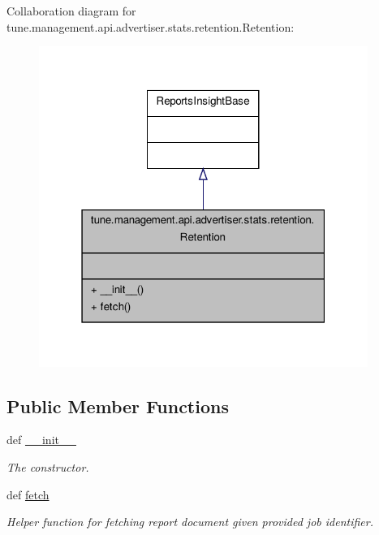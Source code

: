 Collaboration diagram for tune.\-management.\-api.\-advertiser.\-stats.\-retention.\-Retention\-:
\nopagebreak
\begin{figure}[H]
\begin{center}
\leavevmode
\includegraphics[width=304pt]{classtune_1_1management_1_1api_1_1advertiser_1_1stats_1_1retention_1_1Retention__coll__graph}
\end{center}
\end{figure}
\subsection*{Public Member Functions}
\begin{DoxyCompactItemize}
\item 
def \hyperlink{classtune_1_1management_1_1api_1_1advertiser_1_1stats_1_1retention_1_1Retention_ac2fbd3cb788b0409b7211fd03080f65f}{\-\_\-\-\_\-init\-\_\-\-\_\-}
\begin{DoxyCompactList}\small\item\em The constructor. \end{DoxyCompactList}\item 
def \hyperlink{classtune_1_1management_1_1api_1_1advertiser_1_1stats_1_1retention_1_1Retention_a0ecab9d27a30745d5ebed4f53d53bb0e}{fetch}
\begin{DoxyCompactList}\small\item\em Helper function for fetching report document given provided job identifier. \end{DoxyCompactList}\end{DoxyCompactItemize}


